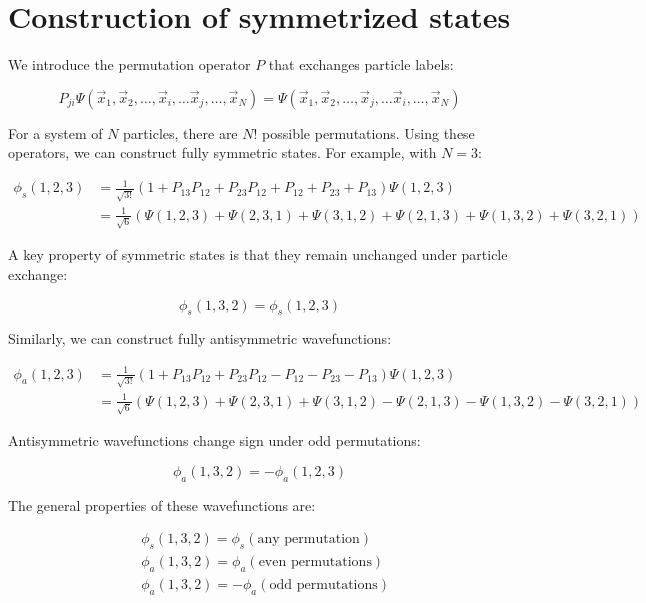 \section{Construction of symmetrized states}
We introduce the permutation operator $P$ that exchanges particle labels:

\begin{equation}
P_{ji}\Psi(\vec{x}_1,\vec{x}_2,\ldots,\vec{x}_i,\ldots\vec{x}_j,\ldots,\vec{x}_N)=\Psi(\vec{x}_1,\vec{x}_2,\ldots,\vec{x}_j,\ldots\vec{x}_i,\ldots,\vec{x}_N)
\end{equation}

For a system of $N$ particles, there are $N!$ possible permutations. Using these operators, we can construct fully symmetric states. For example, with $N=3$:

\begin{align}
\phi_s(1,2,3)&=\frac{1}{\sqrt{3!}}(1+P_{13}P_{12}+P_{23}P_{12}+P_{12}+P_{23}+P_{13})\Psi(1,2,3)\\
&=\frac{1}{\sqrt{6}}(\Psi(1,2,3)+\Psi(2,3,1)+\Psi(3,1,2)+\Psi(2,1,3)+\Psi(1,3,2)+\Psi(3,2,1))
\end{align}

A key property of symmetric states is that they remain unchanged under particle exchange:

\begin{equation}
\phi_s(1,3,2)=\phi_s(1,2,3)
\end{equation}

Similarly, we can construct fully antisymmetric wavefunctions:

\begin{align}
\phi_a(1,2,3)&=\frac{1}{\sqrt{3!}}(1+P_{13}P_{12}+P_{23}P_{12}-P_{12}-P_{23}-P_{13})\Psi(1,2,3)\\
&=\frac{1}{\sqrt{6}}(\Psi(1,2,3)+\Psi(2,3,1)+\Psi(3,1,2)-\Psi(2,1,3)-\Psi(1,3,2)-\Psi(3,2,1))
\end{align}

Antisymmetric wavefunctions change sign under odd permutations:

\begin{equation}
\phi_a(1,3,2)=-\phi_a(1,2,3)
\end{equation}

The general properties of these wavefunctions are:

\begin{align}
&\phi_s(1,3,2)=\phi_s(\text{any permutation})\\
&\phi_a(1,3,2)=\phi_a(\text{even permutations}) \\
&\phi_a(1,3,2)=-\phi_a(\text{odd permutations})
\end{align}


